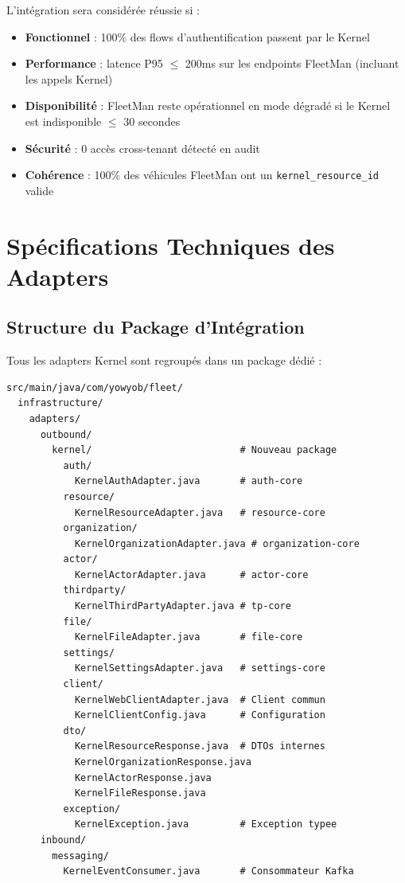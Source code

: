 \documentclass[12pt,a4paper]{report}
\begin{document}
L'intégration sera considérée réussie si :

\begin{itemize}[leftmargin=2cm]
  \item \textbf{Fonctionnel} : 100\% des flows d'authentification passent
        par le Kernel
  \item \textbf{Performance} : latence P95 $\leq$ 200ms sur les endpoints
        FleetMan (incluant les appels Kernel)
  \item \textbf{Disponibilité} : FleetMan reste opérationnel en mode dégradé
        si le Kernel est indisponible $\leq$ 30 secondes
  \item \textbf{Sécurité} : 0 accès cross-tenant détecté en audit
  \item \textbf{Cohérence} : 100\% des véhicules FleetMan ont un
        \texttt{kernel\_resource\_id} valide
\end{itemize}

\chapter{Spécifications Techniques des Adapters}

\section{Structure du Package d'Intégration}

Tous les adapters Kernel sont regroupés dans un package dédié :

\begin{lstlisting}[style=yamlStyle, caption={Structure du package d'intégration Kernel}]
src/main/java/com/yowyob/fleet/
  infrastructure/
    adapters/
      outbound/
        kernel/                          # Nouveau package
          auth/
            KernelAuthAdapter.java       # auth-core
          resource/
            KernelResourceAdapter.java   # resource-core
          organization/
            KernelOrganizationAdapter.java # organization-core
          actor/
            KernelActorAdapter.java      # actor-core
          thirdparty/
            KernelThirdPartyAdapter.java # tp-core
          file/
            KernelFileAdapter.java       # file-core
          settings/
            KernelSettingsAdapter.java   # settings-core
          client/
            KernelWebClientAdapter.java  # Client commun
            KernelClientConfig.java      # Configuration
          dto/
            KernelResourceResponse.java  # DTOs internes
            KernelOrganizationResponse.java
            KernelActorResponse.java
            KernelFileResponse.java
          exception/
            KernelException.java         # Exception typee
      inbound/
        messaging/
          KernelEventConsumer.java       # Consommateur Kafka
\end{lstlisting}
\end{document}
